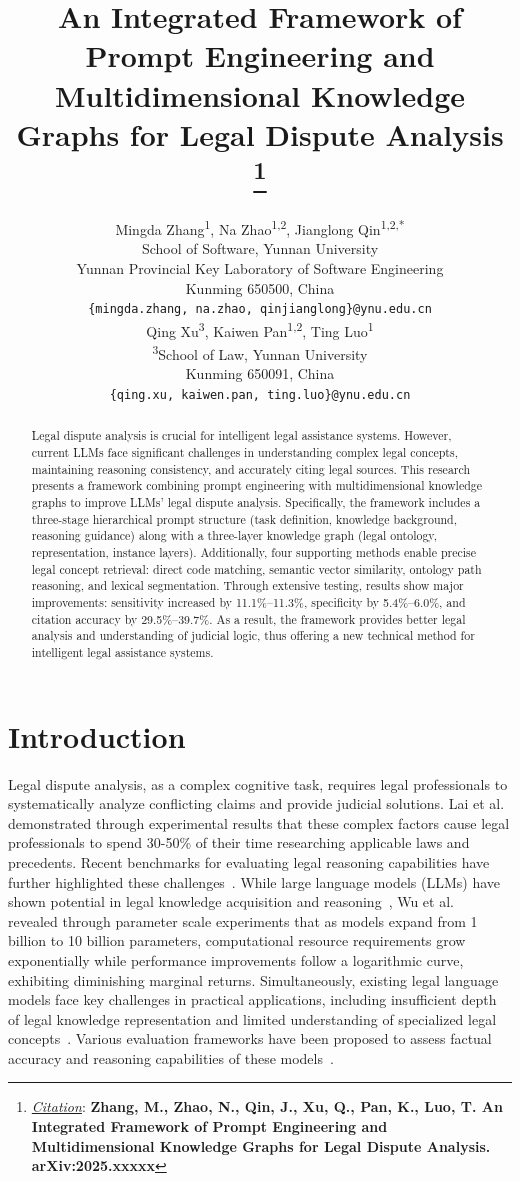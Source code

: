 \documentclass{article}
\title{An Integrated Framework of Prompt Engineering and Multidimensional Knowledge Graphs for Legal Dispute Analysis
\thanks{\textit{\underline{Citation}}: 
\textbf{Zhang, M., Zhao, N., Qin, J., Xu, Q., Pan, K., Luo, T. An Integrated Framework of Prompt Engineering and Multidimensional Knowledge Graphs for Legal Dispute Analysis. arXiv:2025.xxxxx}} 
}
\author{
  Mingda Zhang\textsuperscript{1}, Na Zhao\textsuperscript{1,2}, Jianglong Qin\textsuperscript{1,2,*} \\
  School of Software, Yunnan University \\
  Yunnan Provincial Key Laboratory of Software Engineering \\
  Kunming 650500, China \\
  \texttt{\{mingda.zhang, na.zhao, qinjianglong\}@ynu.edu.cn} \\
  \And
  Qing Xu\textsuperscript{3}, Kaiwen Pan\textsuperscript{1,2}, Ting Luo\textsuperscript{1} \\
  \textsuperscript{3}School of Law, Yunnan University \\
  Kunming 650091, China \\
  \texttt{\{qing.xu, kaiwen.pan, ting.luo\}@ynu.edu.cn} \\
}
\theoremstyle{plain}
\theoremstyle{definition}
\begin{document}
\maketitle

\begin{abstract}
Legal dispute analysis is crucial for intelligent legal assistance systems. However, current LLMs face significant challenges in understanding complex legal concepts, maintaining reasoning consistency, and accurately citing legal sources. This research presents a framework combining prompt engineering with multidimensional knowledge graphs to improve LLMs' legal dispute analysis. Specifically, the framework includes a three-stage hierarchical prompt structure (task definition, knowledge background, reasoning guidance) along with a three-layer knowledge graph (legal ontology, representation, instance layers). Additionally, four supporting methods enable precise legal concept retrieval: direct code matching, semantic vector similarity, ontology path reasoning, and lexical segmentation. Through extensive testing, results show major improvements: sensitivity increased by 11.1\%--11.3\%, specificity by 5.4\%--6.0\%, and citation accuracy by 29.5\%--39.7\%. As a result, the framework provides better legal analysis and understanding of judicial logic, thus offering a new technical method for intelligent legal assistance systems.
\end{abstract}


\section{Introduction}
\label{sec1}

Legal dispute analysis, as a complex cognitive task, requires legal professionals to systematically analyze conflicting claims and provide judicial solutions. Lai et al.~\cite{Lai2023a} demonstrated through experimental results that these complex factors cause legal professionals to spend 30-50\% of their time researching applicable laws and precedents. Recent benchmarks for evaluating legal reasoning capabilities have further highlighted these challenges~\cite{Guha2023}. While large language models (LLMs) have shown potential in legal knowledge acquisition and reasoning~\cite{Brown2020}, Wu et al.~\cite{Wu2023} revealed through parameter scale experiments that as models expand from 1 billion to 10 billion parameters, computational resource requirements grow exponentially while performance improvements follow a logarithmic curve, exhibiting diminishing marginal returns. Simultaneously, existing legal language models face key challenges in practical applications, including insufficient depth of legal knowledge representation and limited understanding of specialized legal concepts~\cite{Wang2024}. Various evaluation frameworks have been proposed to assess factual accuracy and reasoning capabilities of these models~\cite{Glanzer2023}.
\end{document}
